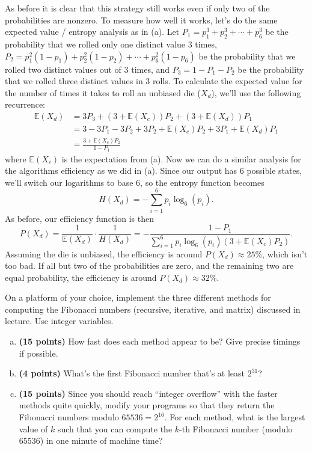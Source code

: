 \documentclass[11pt, letterpaper]{article}
\begin{document}
\begin{solution}
    As before it is clear that this strategy still works even if only two of the probabilities are nonzero. To measure how well it works, let's do the same expected value / entropy analysis as in (a). Let $P_1=p_1^3+p_2^3+\cdots+p_6^3$ be the probability that we rolled only one distinct value $3$ times, $P_2=p_1^2(1-p_1)+p_2^2(1-p_2)+\cdots+p_6^2(1-p_6)$ be the probability that we rolled two distinct values out of $3$ times, and $P_3=1-P_1-P_2$ be the probability that we rolled three distinct values in $3$ rolls. To calculate the expected value for the number of times it takes to roll an unbiased die ($X_d$), we'll use the following recurrence:
    \[
        \begin{aligned}
            \mathbb{E}(X_d)&=3P_3+(3+\mathbb{E}(X_c))P_2+(3+\mathbb{E}(X_d))P_1\\
            &=3-3P_1-3P_2+3P_2+\mathbb{E}(X_c)P_2+3P_1+\mathbb{E}(X_d)P_1\\
            &=\frac{3+\mathbb{E}(X_c)P_2}{1-P_1}
        \end{aligned}
    \]
    where $\mathbb{E}(X_c)$ is the expectation from (a). Now we can do a similar analysis for the algorithms efficiency as we did in (a). Since our output has 6 possible states, we'll switch our logarithms to base $6$, so the entropy function becomes
    \[
        H(X_d)=-\sum^{6}_{i=1}p_i\log_6(p_i)
    .\]
    As before, our efficiency function is then
    \[
        P(X_d)=\frac{1}{\mathbb{E}(X_d)}\cdot \frac{1}{H(X_d)} = -\frac{1-P_1}{\sum_{i=1}^6 p_i\log_6(p_i)(3+\mathbb{E}(X_c)P_2)}
    .\]   
    Assuming the die is unbiased, the efficiency is around $P(X_d)\approx 25\%$, which isn't too bad. If all but two of the probabilities are zero, and the remaining two are equal probability, the efficiency is around $P(X_d)\approx 32\%$.  
\end{solution}

\pagebreak
\begin{problem}
    On a platform of your choice, implement the three different methods for computing the Fibonacci numbers (recursive, iterative, and matrix) discussed in lecture. Use integer variables.
    \begin{enumerate}[(a)]
        \item {\bf (15 points)} How fast does each method appear to be? Give precise timings if possible.
        \item {\bf (4 points)} What's the first Fibonacci number that's at least $2^{31}$?
        \item {\bf (15 points)} Since you should reach ``integer overflow'' with the faster methods quite quickly, modify your programs so that they return the Fibonacci numbers modulo $65536 = 2^{16}$. For each method, what is the largest value of $k$ such that you can compute the $k$-th Fibonacci number (modulo 65536) in one minute of machine time?
    \end{enumerate}
\end{problem}
\end{document}
